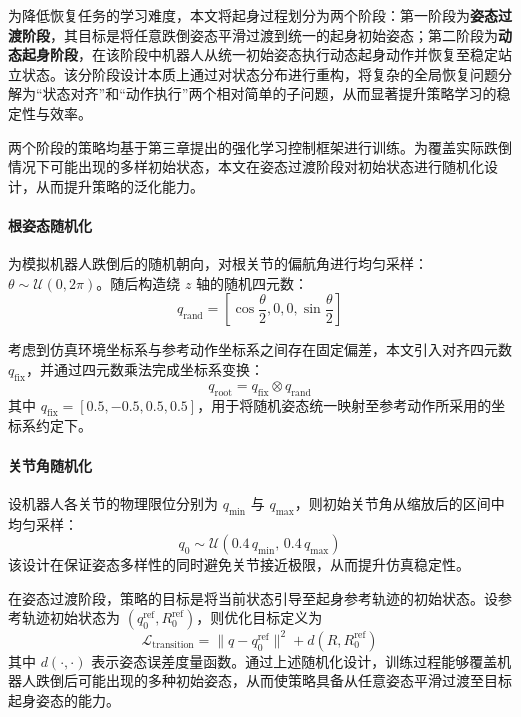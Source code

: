 为降低恢复任务的学习难度，本文将起身过程划分为两个阶段：第一阶段为\textbf{姿态过渡阶段}，其目标是将任意跌倒姿态平滑过渡到统一的起身初始姿态；第二阶段为\textbf{动态起身阶段}，在该阶段中机器人从统一初始姿态执行动态起身动作并恢复至稳定站立状态。该分阶段设计本质上通过对状态分布进行重构，将复杂的全局恢复问题分解为“状态对齐”和“动作执行”两个相对简单的子问题，从而显著提升策略学习的稳定性与效率。

两个阶段的策略均基于第三章提出的强化学习控制框架进行训练。为覆盖实际跌倒情况下可能出现的多样初始状态，本文在姿态过渡阶段对初始状态进行随机化设计，从而提升策略的泛化能力。

\paragraph{根姿态随机化}

为模拟机器人跌倒后的随机朝向，对根关节的偏航角进行均匀采样：$\theta \sim \mathcal{U}(0, 2\pi)$。随后构造绕 $z$ 轴的随机四元数：
\begin{equation}
	q_{\text{rand}} =
	\left[
	\cos\frac{\theta}{2},
	0,
	0,
	\sin\frac{\theta}{2}
	\right]
\end{equation}

考虑到仿真环境坐标系与参考动作坐标系之间存在固定偏差，本文引入对齐四元数 $q_{\text{fix}}$，并通过四元数乘法完成坐标系变换：
\begin{equation}
	q_{\text{root}} =
	q_{\text{fix}}
	\otimes
	q_{\text{rand}}
\end{equation}
其中 $q_{\text{fix}} = [0.5,-0.5,0.5,0.5]$，用于将随机姿态统一映射至参考动作所采用的坐标系约定下。

\paragraph{关节角随机化}

设机器人各关节的物理限位分别为 $q_{\min}$ 与 $q_{\max}$，则初始关节角从缩放后的区间中均匀采样：
\begin{equation}
	q_0 \sim \mathcal{U}\!\left(0.4\,q_{\min},\,0.4\,q_{\max}\right)
\end{equation}
该设计在保证姿态多样性的同时避免关节接近极限，从而提升仿真稳定性。

在姿态过渡阶段，策略的目标是将当前状态引导至起身参考轨迹的初始状态。设参考轨迹初始状态为 $(q^{\text{ref}}_0, R^{\text{ref}}_0)$，则优化目标定义为
\begin{equation}
	\mathcal{L}_{\text{transition}} =
	\|q - q^{\text{ref}}_0\|^2
	+
	d(R,R^{\text{ref}}_0)
\end{equation}
其中 $d(\cdot,\cdot)$ 表示姿态误差度量函数。通过上述随机化设计，训练过程能够覆盖机器人跌倒后可能出现的多种初始姿态，从而使策略具备从任意姿态平滑过渡至目标起身姿态的能力。

